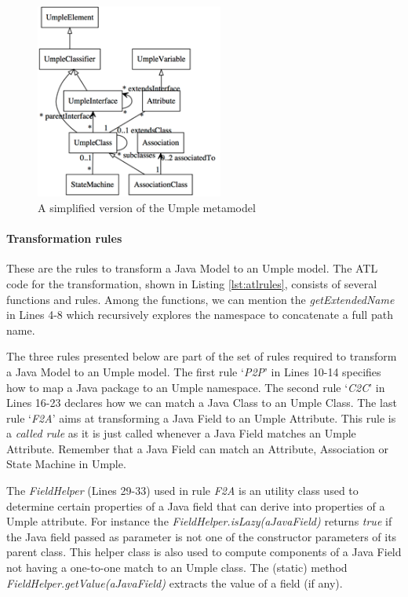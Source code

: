 \begin{figure}[H]
\centering
\includegraphics[width=0.55\textwidth]{Figures/umpleMetamodel.png} 
\caption{A simplified version of the Umple metamodel}
\label{fig:umplemodelatl}
\end{figure}

\paragraph{Transformation rules} 

These are the rules to transform a Java Model to an Umple model. The ATL code for the transformation, shown in Listing \ref{lst:atlrules}, consists of several functions and rules. Among the functions, we can mention the \textit{getExtendedName} in Lines 4-8 which recursively explores the namespace to concatenate a full path name.

The three rules presented below are part of the set of rules required to transform a Java Model to an Umple model.  The first rule `\textit{P2P}' in Lines 10-14  specifies how to map a Java package to an Umple namespace. The second rule `\textit{C2C}' in Lines 16-23 declares how we can match a Java Class to an Umple Class. The last rule `\textit{F2A}' aims at transforming a Java Field to an Umple Attribute. This rule is a \textit{called rule} as it is just called whenever a Java Field matches an Umple Attribute. Remember that a Java Field can match an Attribute, Association or State Machine in Umple.

The \textit{FieldHelper} (Lines 29-33) used in rule \textit{F2A} is an utility class used to determine certain properties of a Java field that can derive into properties of a Umple attribute. For instance the \textit{FieldHelper.isLazy(aJavaField)} returns \textit{true} if the Java field passed as parameter is not one of the constructor parameters of its parent class. This helper class is also used to compute components of a Java Field not having a one-to-one match to an Umple class. The (static) method \textit{FieldHelper.getValue(aJavaField)} extracts the value of a field (if any). 

